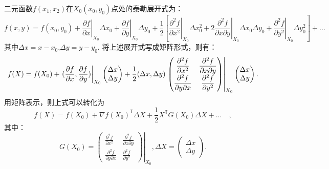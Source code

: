 二元函数$f(x_1,x_2)$在$X_0(x_0,y_0)$点处的泰勒展开式为：
\begin{equation}
    f(x,y) = f(x_0,y_0)
        + \left.\displaystyle\frac{\partial f}{\partial x}\right|_{X_0}\Delta x_0    
        + \left.\displaystyle\frac{\partial f}{\partial y}\right|_{X_0}\Delta y_0    
        + \frac{1}{2}
        \left[ \left.\displaystyle\frac{\partial^2f}{\partial x^2}\right|_{X_0}\Delta x_0^2 + 
          2\left.\displaystyle\frac{\partial^2f}{\partial x\partial y}\right|_{X_0}\Delta x_0\Delta y_0 + 
          \left.\displaystyle\frac{\partial^2f}{\partial y^2}\right|_{X_0}\Delta y_0^2 \right]   
        + ...
\end{equation}
其中$\Delta x = x - x_0$,$\Delta y = y - y_0$.
将上述展开式写成矩阵形式，则有：
\begin{equation}
    f(X) = f(X_0) 
    + \left.( \displaystyle\frac{\partial f}{\partial x},
        \displaystyle\frac{\partial f}{\partial y} )\right|_{X_0}    
        \begin{pmatrix}
             \Delta x \\
             \Delta y
        \end{pmatrix}
    +\newline \frac{1}{2}(\Delta x, \Delta y)
        \left.
        \begin{pmatrix}
            \displaystyle\frac{\partial^2f}{\partial x^2} & \displaystyle\frac{\partial^2f}{\partial x\partial y} \\
            \displaystyle\frac{\partial^2f}{\partial y\partial x} & \displaystyle\frac{\partial^2f}{\partial y^2}
        \end{pmatrix}
        \right|_{X_0}
        \begin{pmatrix}
             \Delta x \\
             \Delta y
        \end{pmatrix} .
\end{equation}
用矩阵表示，则上式可以转化为
\begin{equation}
    f(X) = f(X_0) + \nabla f(X_0)^{\mathbb{T}}\Delta X + \frac{1}{2}X^{\mathbb{T}}G(X_0)\Delta X + ...\quad,
\end{equation}
其中：
\begin{equation}
    G(X_0) = 
        \left.
        \begin{pmatrix}
            \displaystyle\frac{\partial^2f}{\partial x^2} & \displaystyle\frac{\partial^2f}{\partial x\partial y} \\
            \displaystyle\frac{\partial^2f}{\partial y\partial x} & \displaystyle\frac{\partial^2f}{\partial y^2}
        \end{pmatrix}
        \right|_{X_0},
    \Delta X = 
        \begin{pmatrix}
             \Delta x \\
             \Delta y
        \end{pmatrix}.
\end{equation}
